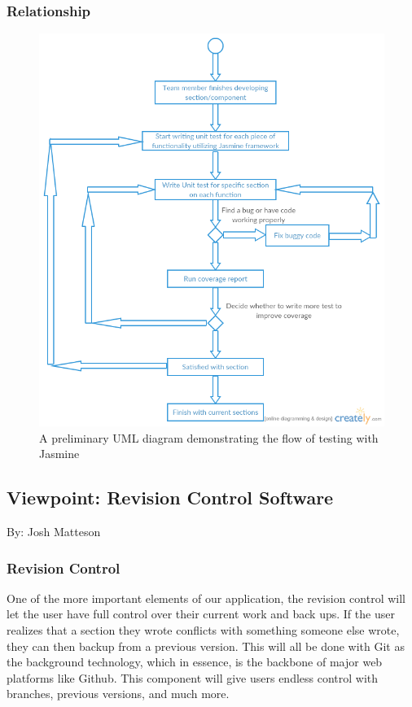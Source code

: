 \documentclass[letterpaper, 10pt, draftclsnofoot, compsoc, onecolumn]{IEEEtran}
\begin{document}
\subsubsection{Relationship}
\begin{figure}[ht!]
\centering
\includegraphics[width=120mm]{Testing.png}
\caption{A preliminary UML diagram demonstrating the flow of testing with Jasmine}
\end{figure}

\newpage
\subsection{Viewpoint: Revision Control Software}
{\noindent By: Josh Matteson \par}

\subsubsection{Revision Control}
{\noindent One of the more important elements of our application, the revision control will let the user have full control
over their current work and back ups. If the user realizes that a section they wrote conflicts with something someone else wrote,
they can then backup from a previous version. This will all be done with Git as the background technology, which in essence, is
the backbone of major web platforms like Github. This component will give users endless control with branches, previous versions,
and much more. \par}
\end{document}
